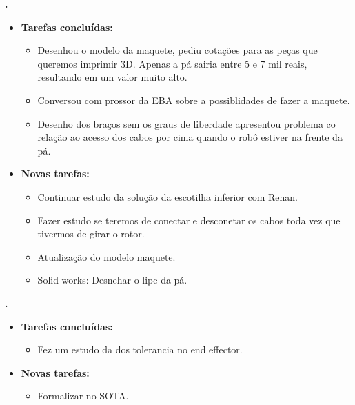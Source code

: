    \textbf{.} 
	\begin{itemize}
		\item \textbf{Tarefas concluídas:}
			\begin{itemize}    
				\item Desenhou o modelo da maquete, pediu cotações para as peças que
				queremos imprimir 3D. Apenas a pá sairia entre 5 e 7 mil reais, resultando
				em um valor muito alto. 
				\item Conversou com prossor da EBA sobre a possiblidades de fazer a maquete.
				\item Desenho dos braços sem os graus de liberdade apresentou problema co
				relação ao acesso dos cabos por cima quando o robô estiver na frente da pá.
				
			\end{itemize}
		
		\item \textbf{Novas tarefas:}
			\begin{itemize} 
			    \item Continuar estudo da solução da escotilha inferior com Renan.
			    \item Fazer estudo se teremos de conectar e desconetar os cabos toda vez
			    que tivermos de girar o rotor.
				\item Atualização do modelo maquete.
			    \item Solid works: Desnehar o lipe da pá.
			\end{itemize}
	\end{itemize}

	  \textbf{\renan.} 
	\begin{itemize}
		\item \textbf{Tarefas concluídas:}
			\begin{itemize}    
				\item Fez um estudo da dos tolerancia no end effector. 
			\end{itemize}
		
		\item \textbf{Novas tarefas:}
			\begin{itemize} 
			    \item Formalizar no SOTA. 
			\end{itemize}
	\end{itemize}		
			
